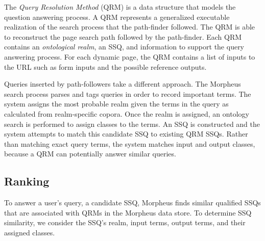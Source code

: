 \begin{table}\footnotesize
{}
	\caption{Example SSQ Model.}
	\label{tab:ssq_example}
\end{table}


The \emph{Query Resolution Method} (QRM) is a data structure that models the question answering process. A QRM represents a generalized executable realization of the search process that the path-finder followed. The QRM is able to reconstruct the page search path followed by the path-finder. Each QRM contains an \emph{ontological realm}, an SSQ, and information to support the query answering process. For each dynamic page, the QRM contains a list of inputs to the URL such as form inputs and the possible reference outputs.



Queries inserted by path-followers take a different approach. The Morpheus search process parses and tags queries in order to record important terms. The system assigns the most probable realm given the terms in the query as calculated from realm-specific copora. Once the realm is assigned, an ontology search is performed to assign classes to the terms. An SSQ is constructed and the system attempts to match this candidate SSQ to existing QRM SSQs. Rather than matching exact query terms, the system matches input and output classes, because a QRM can potentially answer similar queries.


\subsection{Ranking} 
\label{sec:qrm_ranking}

To answer a user's query, a candidate SSQ, Morpheus finds similar qualified SSQs that are associated with QRMs in the Morpheus data store.  To determine SSQ similarity, we consider the SSQ's realm, input terms, output terms, and their assigned classes. 

